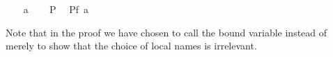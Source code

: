 \begin{isabellebody}
{}
\isanewline
\ \ \isamarkupfalse%
\ a\isanewline
\ \ \isamarkupfalse%
\ P\ \isamarkupfalse%
\ {\isachardoublequoteopen}P{\isacharparenleft}f\ a{\isacharparenright}{\isachardoublequoteclose}\ \isacommand{{\isachardot}{\isachardot}}\isamarkupfalse%
\ \ %
\isanewline
{}\isamarkupfalse%
%
\endisatagproof
{\isafoldproof}%
%
\isadelimproof
%
\endisadelimproof
%
\begin{isamarkuptext}%
\noindent Note that in the proof we have chosen to call the bound
variable  instead of  merely to show that the choice of
local names is irrelevant.


\end{isamarkuptext}
\end{isabellebody}
